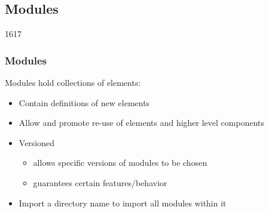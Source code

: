 %
%
%
%

\subsection{Modules}
\begin{slide}{1617}\frametitle{Modules}

Modules hold collections of elements:

\begin{itemize}
\item Contain definitions of new elements
\item Allow and promote re-use of elements and higher level components
\item Versioned
  \begin{itemize}
  \item allows specific versions of modules to be chosen
  \item guarantees certain features/behavior
  \end{itemize}
\item Import a directory name to import all modules within it
\end{itemize}


\end{slide}



